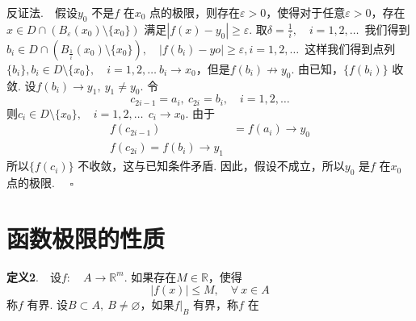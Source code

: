 \documentclass{article}
\begin{document}
反证法.\ \ 假设\(y_0\) 不是\(f\) 在\(x_0\) 点的极限，则存在\(\varepsilon > 0\)，使得对于任意\(\varepsilon > 0\)，存在\(x \in D \cap \left( B_{\varepsilon }(x_0)\setminus \{x_0\}  \right) \) 满足\(| f(x) - y_0 | \ge \varepsilon  \). 取\(\delta = \frac{1}{i},\quad i = 1,2,\dots  \)\ 我们得到\(b_i \in D \cap \left( B_{\frac{1}{i} }(x_0)\setminus \{x_0\}  \right),\quad | f(b_i) - yo | \ge \varepsilon ,i = 1,2,\dots   \)\ 这样我们得到点列\(\{b_i\},b_i \in D\setminus \{x_0\},\quad i = 1,2,\dots \ b_i \to x_0  \)，但是\(f(b_i) \not\to y_0\). 由已知，\(\{f(b_i)\} \) 收敛. 设\(f(b_i)\to y_1,\ y_1 \neq y_0\). 令
\begin{equation*}
    c_{2i - 1} = a_i,\ c_{2i} = b_i,\quad i = 1,2,\dots
\end{equation*}
则\(c_i \in D\setminus \{x_0\},\quad i = 1,2,\dots \ \ c_i \to x_0 \). 由于
\begin{align*}
    f(c_{2i - 1}) &= f(a_i) \to y_0 \\
    f(c_{2i}) = f(b_i) \to y_1
\end{align*}
所以\(\{f(c_i)\} \) 不收敛，这与已知条件矛盾. 因此，假设不成立，所以\(y_0\) 是\(f\) 在\(x_0\) 点的极限. \(\quad \square\)

\newpage

\section{函数极限的性质}
\textbf{定义2}.\ \ 设\(f:\quad A \to \mathbb{R}^{m}\). 如果存在\(M \in \mathbb{R}\)，使得
\begin{equation*}
    | f(x)  | \le M,\quad \forall\ x \in A
\end{equation*}
称\(f\) 有界. 设\(B \subset A,\ B \neq \varnothing \)，如果\(f|_{B}\) 有界，称\(f\) 在\(\)
\end{document}
